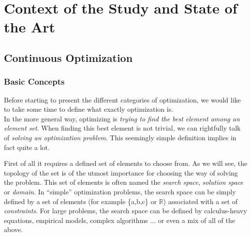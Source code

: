 \part{Context of the Study and State of the Art}


\chapter{Continuous Optimization}

\section{Basic Concepts}

Before starting to present the different categories of optimization, we would like to take some time to define what exactly optimization is.\\
In the more general way, optimizing is \emph{trying to find the best element among an element set}. When finding this best element is not trivial, we can rightfully talk of \emph{solving an optimization problem}. This seemingly simple definition implies in fact quite a lot.

First of all it requires a defined set of elements to choose from. As we will see, the topology of the set is of the utmost importance for choosing the way of solving the problem. This set of elements is often named the \emph{search space}, \emph{solution space} or \emph{domain}. In \enquote{simple} optimization problems, the search space can be simply defined by a set of elements (for example \{a,b,c\} or \ensuremath{\mathbb{R}}) associated with a set of \emph{constraints}. For large problems, the search space can be defined by calculus-heavy equations, empirical models, complex algorithms ... or even a mix of all of the above.


